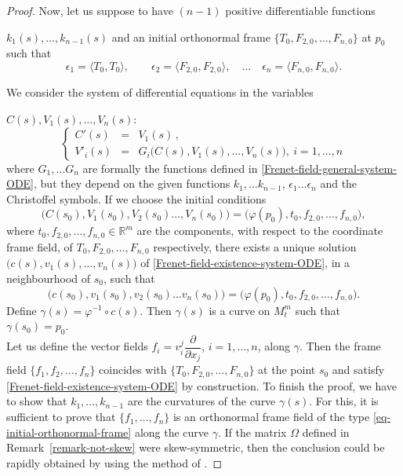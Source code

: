 \documentclass[11pt]{amsart}
\theoremstyle{plain}
\theoremstyle{definition}
\numberwithin{equation}{section}
\begin{document}
\begin{proof}
Now, let us suppose to  have $(n-1)$ positive  differentiable functions 

\noindent $k_1(s), \dots, k_{n-1}(s)$ and an initial orthonormal frame $\{T_0,F_{2,0},\ldots,F_{n,0}\}$ at $p_0$ such that
\begin{equation}\label{eq-initial-orthonormal-frame}
\epsilon_1 = \langle T_0, T_0 \rangle , \qquad \epsilon_2 =  \langle F_{2,0}, F_{2,0} \rangle , \quad \dots \quad \epsilon_n = \langle F_{n,0}, F_{n,0} \rangle .
\end{equation}

We consider the system of differential equations in the variables 

\noindent $C(s), V_1(s), \dots, V_n(s)$:
\begin{equation}\label{Frenet-field-existence-system-ODE}
\left \{
\begin{array}{ccl}
C'(s)&=&V_1(s)\,, \\[1 ex]
V'_i(s) &=& G_i\big(C(s), V_1(s), ..., V_n(s)\big),\  i=1,  \dots, n
\end{array} \right .
\end{equation}
where $G_1, \dots G_n$ are formally the functions defined in \eqref{Frenet-field-general-system-ODE}, but they depend  on the given functions $k_1, \dots k_{n-1}$, $\epsilon_1 \dots \epsilon_n$ and the Christoffel symbols.
If we choose the initial conditions
\[
\big(C(s_0), V_1(s_0), V_2(s_0) \dots, V_n(s_0)\big ) =\big (\varphi(p_0), t_0, f_{2,0},\ldots,f_{n,0}\big ),
\]
where $t_0,f_{2,0},\ldots,f_{n,0} \in \mathbb{R}^m$ are the components, with respect to the coordinate frame field, 
of $T_0, F_{2,0},\ldots,F_{n,0}$ respectively, there exists a unique solution $\big(c(s),v_1(s), \dots, v_n(s)\big)$ of \eqref{Frenet-field-existence-system-ODE}, in a neighbourhood of $s_0$, such that 
\[
\big(c(s_0), v_1(s_0), v_2(s_0) \dots v_n(s_0)\big) = \big(\varphi(p_0), t_0, f_{2,0},\ldots,f_{n,0}\big).
\]
Define $\gamma(s) = \varphi^{-1} \circ c(s)$. Then $\gamma(s)$ is a curve on $M_t^m$ such that $\gamma(s_0) = p_0$.\\
Let us define the vector fields $f_i = v_i^j \dfrac{\partial}{\partial x_j}$, $i=1, \dots, n$,  along $\gamma$. Then the frame field $\{f_1, f_2,\dots, f_n\}$  coincides with $\{ T_0, F_{2,0},\ldots,F_{n,0} \}$ at the point $s_0$ and satisfy \eqref{Frenet-field-existence-system-ODE} by construction. To finish the proof, we have to show that $k_1, \dots, k_{n-1}$ are the curvatures of the curve $\gamma(s)$. For this, it is sufficient to prove that $\{f_1,\dots, f_n\}$ is an orthonormal frame field of the type \eqref{eq-initial-orthonormal-frame} along the curve $\gamma$. If the matrix $\Omega$ defined in Remark~\ref{remark-not-skew} were skew-symmetric, then the conclusion could be rapidly obtained by using the method of \cite[Theorem~6, p. 124]{MR1998826}. 


\end{proof}
\end{document}
